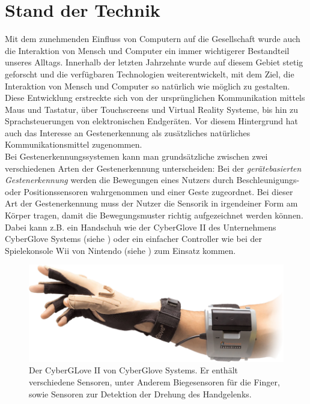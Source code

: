 \chapter{Stand der Technik}
\label{ch:StandDerTechnik}

Mit dem zunehmenden Einfluss von Computern auf die Gesellschaft wurde auch die Interaktion von Mensch und Computer ein immer wichtigerer Bestandteil unseres Alltags. Innerhalb der letzten Jahrzehnte wurde auf diesem Gebiet stetig geforscht und die verfügbaren Technologien weiterentwickelt, mit dem Ziel, die Interaktion von Mensch und Computer so natürlich wie möglich zu gestalten. Diese Entwicklung erstreckte sich von der ursprünglichen Kommunikation mittels Maus und Tastatur, über Touchscreens und Virtual Reality Systeme, bis hin zu Sprachsteuerungen von elektronischen Endgeräten. Vor diesem Hintergrund hat auch das Interesse an Gestenerkennung als zusätzliches natürliches Kommunikationsmittel zugenommen. \\
Bei Gestenerkennungssystemen kann man grundsätzliche zwischen zwei verschiedenen Arten der Gestenerkennung unterscheiden: Bei der \textit{gerätebasierten Gestenerkennung} werden die Bewegungen eines Nutzers durch Beschleunigungs- oder Positionssensoren wahrgenommen und einer Geste zugeordnet. Bei dieser Art der Gestenerkennung muss der Nutzer die Sensorik in irgendeiner Form am Körper tragen, damit die Bewegungsmuster richtig aufgezeichnet werden können. Dabei kann z.B. ein Handschuh wie der CyberGlove II des Unternehmens CyberGlove Systems (siehe ) oder ein einfacher Controller wie bei der Spielekonsole Wii von Nintendo (siehe ) zum Einsatz kommen. \\
\begin{figure}[H]
	\centering
	\includegraphics[scale=0.4]{../figures/CyberGlove.png}
	\caption{Der CyberGLove II von CyberGlove Systems. Er enthält verschiedene Sensoren, unter Anderem Biegesensoren für die Finger, sowie Sensoren zur Detektion der Drehung des Handgelenks. }
	\label{fig:CyberGlove}
\end{figure}
